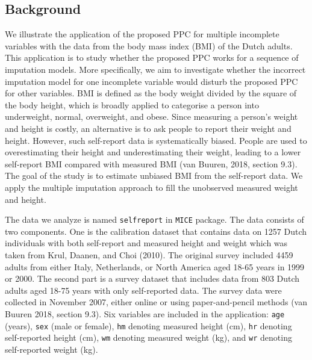 \documentclass[12pt, fullpage, a4paper]{article}
\begin{document}
\subsection{Background}
We illustrate the application of the proposed PPC for multiple incomplete variables with the data from the body mass index (BMI) of the Dutch adults. This application is to study whether the proposed PPC works for a sequence of imputation models. More specifically, we aim to investigate whether the incorrect imputation model for one incomplete variable would disturb the proposed PPC for other variables. BMI is defined as the body weight divided by the square of the body height, which is broadly applied to categorise a person into underweight, normal, overweight, and obese. Since measuring a person's weight and height is costly, an alternative is to ask people to report their weight and height. However, such self-report data is systematically biased. People are used to overestimating their height and underestimating their weight, leading to a lower self-report BMI compared with measured BMI (van Buuren, 2018, section 9.3). The goal of the study is to estimate unbiased BMI from the self-report data. We apply the multiple imputation approach to fill the unobserved measured weight and height. 


The data we analyze is named \texttt{selfreport} in \texttt{MICE} package. The data consists of two components. One is the calibration dataset that contains data on 1257 Dutch individuals with both self-report and measured height and weight which was taken from Krul, Daanen, and Choi (2010)\nocite{krul2011self}. The original survey included 4459 adults from either Italy, Netherlands, or North America aged 18-65 years in 1999 or 2000. The second part is a survey dataset that includes data from 803 Dutch adults aged 18-75 years with only self-reported data. The survey data were collected in November 2007, either online or using paper-and-pencil methods (van Buuren 2018, section 9.3). Six variables are included in the application: \texttt{age} (years), \texttt{sex} (male or female), \texttt{hm} denoting measured height (cm), \texttt{hr} denoting self-reported height (cm), \texttt{wm} denoting measured weight (kg), and \texttt{wr} denoting self-reported weight (kg). 
\end{document}
